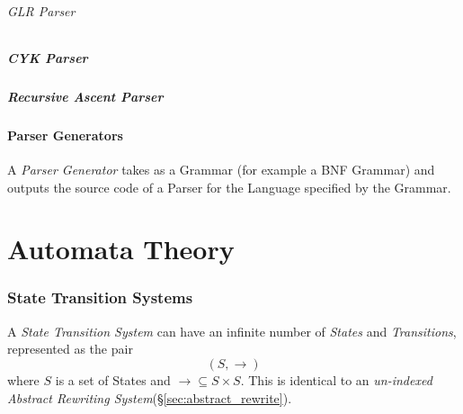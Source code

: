 \documentclass{article}
\begin{document}
\paragraph{GLR Parser}

\subsubsection{CYK Parser}

\subsubsection{Recursive Ascent Parser}

\subsection{Parser Generators}\label{subsec:parser_generator}

A \emph{Parser Generator} takes as a Grammar (for example a BNF
Grammar) and outputs the source code of a Parser for the Language
specified by the Grammar.



\part{Automata Theory}\label{sec:automata_theory}

\section{State Transition Systems} \label{sec:state_transition_system}

A \emph{State Transition System} can have an infinite number of
\emph{States} and \emph{Transitions}, represented as the pair
\[
    (S,\rightarrow)
\]
where $S$ is a set of States and $\rightarrow \subseteq S \times
S$. This is identical to an \emph{un-indexed Abstract Rewriting
  System}(\S \ref{sec:abstract_rewrite}).
\end{document}
